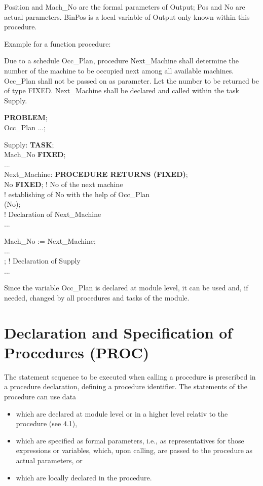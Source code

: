 Position and Mach\_No are the formal parameters of Output; Pos and No
are actual parameters. BinPos is a local variable of Output only known
within this procedure.

Example for a function procedure:

Due to a schedule Occ\_Plan, procedure Next\_Machine shall determine the
number of the machine to be occupied next among all available machines.
Occ\_Plan shall not be passed on as parameter. Let the number to be
returned be of type FIXED. Next\_Machine shall be declared and called
within the task Supply.

{\bf PROBLEM};\\
 Occ\_Plan ...;

\x Supply: {\bf TASK};\\
\x \x {} Mach\_No {\bf FIXED};\\
\x \x \x ... \\
\x \x \x Next\_Machine: {\bf PROCEDURE RETURNS (FIXED)};\\
\x \x \x \x {} No {\bf FIXED}; ! No of the next machine\\
\x \x \x \x \x \x ! establishing of No with the help of Occ\_Plan\\
\x \x \x \x {} (No);\\
\x \x \x {} ! Declaration of Next\_Machine\\
\x \x \x ...

\x \x \x Mach\_No := Next\_Machine;\\
\x \x \x ... \\
\x {}; ! Declaration of Supply\\
\x ...

Since the variable Occ\_Plan is declared at module level, it can be used
and, if needed, changed by all procedures and tasks of the module.

\section{Declaration and Specification of Procedures (PROC)}  %

The statement sequence to be executed when calling a procedure is
prescribed in a procedure declaration, defining a procedure identifier.
The statements of the procedure can use data
\begin{itemize}
\item which are declared at module level or in a higher level relativ to the procedure
(see 4.1),
\item which are specified as formal parameters, i.e., as representatives
for those expressions or variables, which, upon calling, are passed
to the procedure as actual parameters, or
\item which are locally declared in the procedure.
\end{itemize}

